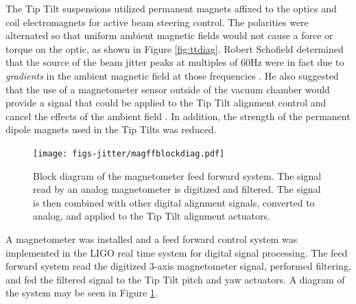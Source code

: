 The Tip Tilt suspensions utilized permanent magnets affixed to the optics and coil electromagnets for active beam steering control. %
The polarities were alternated so that uniform ambient magnetic fields would not cause a force or torque on the optic, as shown in Figure \ref{fig:ttdiag}. %
Robert Schofield determined that the source of the beam jitter peaks at multiples of 60Hz were in fact due to \emph{gradients} in the ambient magnetic field at those frequencies \cite{60Hzgrad}. %
He also suggested that the use of a magnetometer sensor outside of the vacuum chamber would provide a signal that could be applied to the Tip Tilt alignment control and cancel the effects of the ambient field \cite{60hzff}. %
In addition, the strength of the permanent dipole magnets used in the Tip Tilts was reduced.

\begin{figure}
  \begin{center}
  \leavevmode
  \texttt{[image: figs-jitter/magffblockdiag.pdf]}
  \end{center}
  \caption[Block diagram of the magnetometer feed forward system.]{Block diagram of the magnetometer feed forward system. The signal read by an analog magnetometer is digitized and filtered. The signal is then combined with other digital alignment signals, converted to analog, and applied to the Tip Tilt alignment actuators.}
  \label{fig:magffblockdiag}
\end{figure}

A magnetometer was installed and a feed forward control system was implemented in the LIGO real time system for digital signal processing. %
The feed forward system read the digitized 3-axis magnetometer signal, performed filtering, and fed the filtered signal to the Tip Tilt pitch and yaw actuators. %
A diagram of the system may be seen in Figure \ref{fig:magffblockdiag}. %


